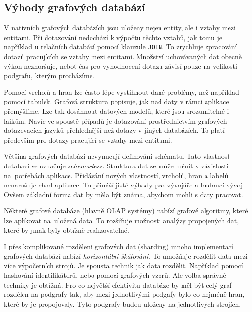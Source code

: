 \documentclass[
  program=infoi,
  biblatex=true,
  figures=true,
  glossaries=false,
  index,
  sourcecodes=true
]{kidiplom}
\begin{document}
\subsection{Výhody grafových databází}
V nativních grafových databázích jsou uloženy nejen entity, ale i vztahy mezi entitami. Při dotazování nedochází k výpočtu těchto vztahů, jak tomu je například u relačních databází pomocí klauzule \texttt{JOIN}. To zrychluje zpracování dotazů pracujících se vztahy mezi entitami. Množství uchovávaných dat obecně výkon nezhoršuje, neboť čas pro vyhodnocení dotazu závisí pouze na velikosti podgrafu, kterým procházíme.

Pomocí vrcholů a hran lze často lépe vystihnout dané problémy, než například pomocí tabulek. Grafová struktura popisuje, jak nad daty v rámci aplikace přemýšlíme. Lze tak dosáhnout datových modelů, které jsou srozumitelné i laikům. Navíc ve spoustě případů je dotazování prostřednictvím grafových dotazovacích jazyků přehlednější než dotazy v jiných databázích. To platí především pro dotazy pracující se vztahy mezi entitami.

Většina grafových databází nevynucují definování schématu. Tato vlastnost databází se označuje \textit{schema-less}. Struktura dat se může měnit v závislosti na~potřebách aplikace. Přidávání nových vlastností, vrcholů, hran a labelů nenarušuje chod aplikace. To přináší jisté výhody pro vývojáře a budoucí vývoj. Ovšem základní forma dat by měla být známa, abychom mohli s daty pracovat.

Některé grafové databáze (hlavně OLAP systémy) nabízí grafové algoritmy, které lze aplikovat na~uložená data. To rozšiřuje možnosti analýzy propojených dat, které by jinak byly obtížně realizovatelné.

I přes komplikované rozdělení grafových dat (sharding) mnoho implementací grafových databází nabízí \textit{horizontální škálování}. To umožňuje rozdělit data mezi více výpočetních strojů. Je spousta technik jak data rozdělit. Například pomocí hashování identifikátorů, nebo pomocí grafových vzorů. Ale volba správné techniky je obtížná. Pro co největší efektivitu databáze by měl být celý graf rozdělen na podgrafy tak, aby mezi jednotlivými podgafy bylo co nejméně hran, které by je propojovaly. Tyto podgrafy budou uloženy na jednotlivých strojích.\cite{practitioner}
\end{document}
